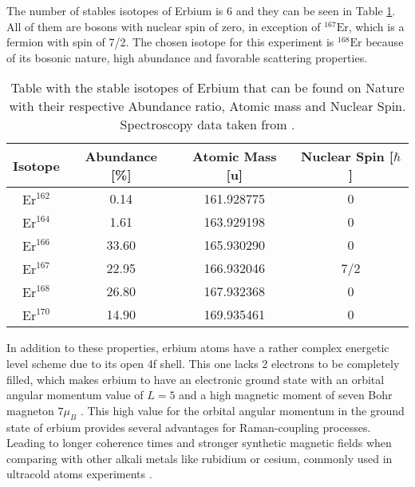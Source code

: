 The number of stables isotopes of Erbium is 6 and they can be seen in Table \ref{tab:Isotopes_Erbium}. All of them are bosons with nuclear spin of zero, in exception of $^{\text{167}}\text{Er}$, which is a fermion with spin of 7/2. The chosen isotope for this experiment is $^{\text{168}}\text{Er}$ because of its bosonic nature, high abundance and favorable scattering properties.

\begin{table}[htbp] \centering
	\begin{tabular}{@{}c|c|c|c@{}}\hline
		Isotope                  & Abundance [\%]          & Atomic Mass [u] & Nuclear Spin [$\hbar$] \\ \hline\hline
		$\text{Er}^{\text{162}}$ &  0.14                   & 161.928775      & 0   \\
		$\text{Er}^{\text{164}}$ &  1.61                   & 163.929198      & 0   \\ 
		$\text{Er}^{\text{166}}$ & 33.60                   & 165.930290      & 0   \\
		$\text{Er}^{\text{167}}$ & 22.95                   & 166.932046      & 7/2   \\
		$\text{Er}^{\text{168}}$ & 26.80                   & 167.932368      & 0   \\  
		$\text{Er}^{\text{170}}$ & 14.90                   & 169.935461      & 0   \\  \hline
	\end{tabular}
	\caption[Table with the stable isotopes of Erbium]{Table with the stable isotopes of Erbium that can be found on Nature with their respective Abundance ratio, Atomic mass and Nuclear Spin. Spectroscopy data taken from \cite{sansonetti2005handbook}.}\label{tab:Isotopes_Erbium}
\end{table}

In addition to these properties, erbium atoms have a rather complex energetic level scheme due to its open 4f shell. This one lacks 2 electrons to be completely filled, which makes erbium to have an electronic ground state with an orbital angular momentum value of $L = 5$ and a high magnetic moment of seven Bohr magneton $7\mu_B$ \cite{ban2005laser}. This high value for the orbital angular momentum in the ground state of erbium provides several advantages for Raman-coupling processes. Leading to longer coherence times and stronger synthetic magnetic fields when comparing with other alkali metals like rubidium or cesium, commonly used in ultracold atoms experiments  \cite{cui2013synthetic}.


